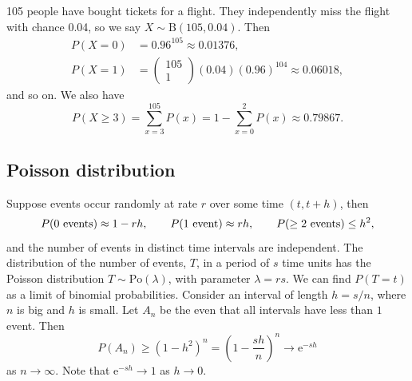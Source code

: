 \documentclass[letter-paper]{tufte-book}
\newenvironment{example}[1][Example]{\begin{trivlist}
\item[\hskip \labelsep {\bfseries #1}]}{\end{trivlist}}
\newcommand{\ex}{\mathrm{e}}
\begin{document}
\begin{example}
  105 people have bought tickets for a flight. They independently miss the
  flight with chance 0.04, so we say $X\sim \mbox{B}(105,0.04)$. Then
  \begin{align*}
    P(X=0) &= 0.96^{105} \approx 0.01376,\\
    P(X=1) &= \begin{pmatrix}105\\ 1\end{pmatrix}(0.04)(0.96)^{104} \approx
    0.06018,
  \end{align*}
  and so on. We also have
  \begin{equation*}
    P(X \geq 3) = \sum_{x=3}^{105} P(x) = 1-\sum_{x=0}^2 P(x) \approx 0.79867.
  \end{equation*}
\end{example}


\subsection{Poisson distribution}

Suppose events occur randomly at rate $r$ over some time $(t, t+h)$, then
\begin{equation*}
  P(0\ \textnormal{events}) \approx 1-rh,\qquad
  P(1\ \textnormal{event}) \approx rh,\qquad
  P(\geq 2\ \textnormal{events}) \leq h^2,
\end{equation*}
and the number of events in distinct time intervals are independent. The
distribution of the number of events, $T$, in a period of $s$ time units has the
Poisson distribution $T\sim\mbox{Po}(\lambda)$, with parameter $\lambda=rs$. We
can find $P(T=t)$ as a limit of binomial probabilities. Consider an interval of
length $h=s/n$, where $n$ is big and $h$ is small. Let $A_n$ be the even that
all intervals have less than $1$ event. Then
\begin{equation*}
  P(A_n) \geq (1-h^2)^n = \left(1-\frac{sh}{n}\right)^n \to \ex^{-sh}
\end{equation*}
as $n\to\infty$. Note that $\ex^{-sh}\to 1$ as $h\to 0$.
\end{document}
